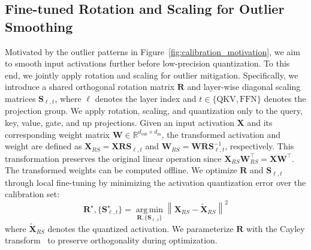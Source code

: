 \documentclass{article}
\begin{document}
\subsection{Fine-tuned Rotation and Scaling for Outlier Smoothing}
\label{sec:rotation-scaling}
Motivated by the outlier patterns in Figure~\ref{fig:calibration_motivation}, we aim to smooth input activations further before low-precision quantization. To this end, we jointly apply rotation and scaling for outlier mitigation. Specifically, we introduce a shared orthogonal rotation matrix $\mathbf{R}$ and layer-wise diagonal scaling matrices $\mathbf{S}_{\ell,t}$, where $\ell$ denotes the layer index and $t\in \{{\mathrm{QKV},\mathrm{FFN}}\}$ denotes the projection group. We apply rotation, scaling, and quantization only to the query, key, value, gate, and up projections. Given an input activation $\mathbf{X}$ and its corresponding weight matrix $\mathbf{W}\in\mathbb{R}^{d_{\mathrm{out}}\times d_{\mathrm{in}}}$, the transformed activation and weight are defined as $\mathbf{X}_{RS}=\mathbf{X}\mathbf{R}\mathbf{S}_{\ell,t}$ and $\mathbf{W}_{RS}=\mathbf{W}\mathbf{R}\mathbf{S}_{\ell,t}^{-1}$, respectively. This transformation preserves the original linear operation since $\mathbf{X}_{RS}\mathbf{W}_{RS}^{\top}=\mathbf{X}\mathbf{W}^{\top}$. The transformed weights can be computed offline. We optimize $\mathbf{R}$ and $\mathbf{S}_{\ell,t}$ through local fine-tuning by minimizing the activation quantization error over the calibration set:
\begin{equation}
    \label{eqn:activation-optimization}
    \mathbf{R}^{\star}, \{\mathbf{S}_{\ell,t}^{\star}\}
    =
    \operatorname*{arg\,min}_{\mathbf{R}, \{\mathbf{S}_{\ell,t}\}}
    \left\|
    \mathbf{X}_{RS}
    -
    \widetilde{\mathbf{X}}_{RS}
    \right\|^{2}
\end{equation}
where $\widetilde{\mathbf{X}}_{RS}$ denotes the quantized activation. We parameterize $\mathbf{R}$ with the Cayley transform~\citep{nishimori2005learning,li2020efficient,liu2024spinquant} to preserve orthogonality during optimization.
\end{document}
